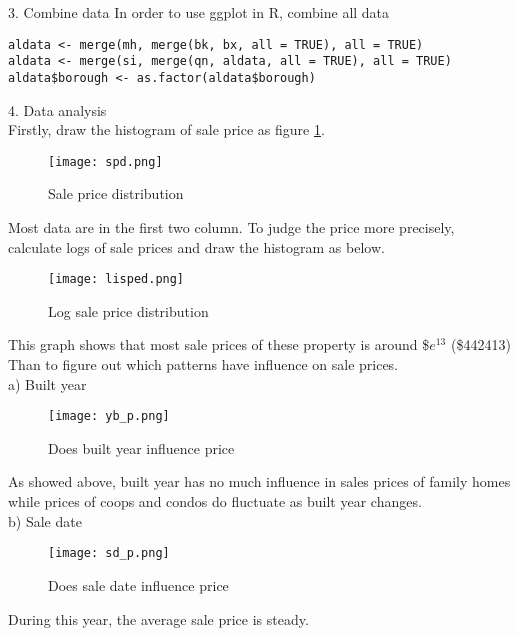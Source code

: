 \documentclass{article}
\begin{document}
3. Combine data
In order to use ggplot in R, combine all data
\begin{verbatim}
aldata <- merge(mh, merge(bk, bx, all = TRUE), all = TRUE)
aldata <- merge(si, merge(qn, aldata, all = TRUE), all = TRUE)
aldata$borough <- as.factor(aldata$borough)
\end{verbatim}
4. Data analysis \\
Firstly, draw the histogram of sale price as figure \ref{spd}. \\
\begin{figure}[htbp] 
\begin{center} 
\texttt{[image: spd.png]}  
\caption{Sale price distribution} 
\label{spd} 
\end{center} 
\end{figure}
Most data are in the first two column. To judge the price more precisely, calculate logs of sale prices and draw the histogram as below. \\
\begin{figure}[H] 
\begin{center} 
\texttt{[image: lisped.png]}  
\caption{Log sale price distribution} 
\label{lisped} 
\end{center} 
\end{figure}
This graph shows that most sale prices of these property is around \$$e^{13}$ (\$442413) \\
Than to figure out which patterns have influence on sale prices. \\

\noindent a) Built year\\
\begin{figure}[H] 
\begin{center} 
\texttt{[image: yb\_p.png]}  
\caption{Does built year influence price} 
\label{lisped} 
\end{center} 
\end{figure}
As showed above, built year has no much influence in sales prices of family homes while prices of coops and condos do fluctuate as built year changes. \\

\noindent b) Sale date \\
\begin{figure}[H] 
\begin{center} 
\texttt{[image: sd\_p.png]}  
\caption{Does sale date influence price} 
\label{sd_p} 
\end{center} 
\end{figure}
During this year, the average sale price is steady.  \\
\end{document}

